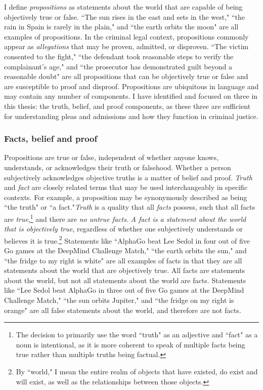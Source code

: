 I define \textit{propositions} as statements about the world that are capable of being objectively true or false. ``The sun rises in the east and sets in the west," ``the rain in Spain is rarely in the plain," and ``the earth orbits the moon" are all examples of propositions. In the criminal legal context, propositions commonly appear as \textit{allegations} that may be proven, admitted, or disproven. ``The victim consented to the fight," ``the defendant took reasonable steps to verify the complainant's age," and ``the prosecutor has demonstrated guilt beyond a reasonable doubt" are all propositions that can be objectively true or false and are susceptible to proof and disproof. Propositions are ubiquitous in language and may contain any number of components. I have identified and focused on three in this thesis: the truth, belief, and proof components, as these three are sufficient for understanding pleas and admissions and how they function in criminal justice.

\subsubsection{Facts, belief and proof}

Propositions are true or false, independent of whether anyone knows, understands, or acknowledges their truth or falsehood. Whether a person subjectively acknowledges objective truths is a matter of belief and proof. \textit{Truth} and \textit{fact} are closely related terms that may be used interchangeably in specific contexts. For example, a proposition may be synonymously described as being ``the truth" or ``a fact."\textit{Truth} is a quality that all \textit{facts} possess, such that all facts are \textit{true},\footnote{The decision to primarily use the word ``truth" as an adjective and ``fact" as a noun is intentional, as it is more coherent to speak of multiple facts being true rather than multiple truths being factual.} and there are \textit{no untrue facts}. \textit{A fact is a statement about the world that is objectively true}, regardless of whether one subjectively understands or believes it is true.\footnote{By ``world," I mean the entire realm of objects that have existed, do exist and will exist, as well as the relationships between those objects.} Statements like ``AlphaGo beat Lee Sedol in four out of five Go games at the DeepMind Challenge Match," ``the earth orbits the sun," and ``the fridge to my right is white" are all examples of facts in that they are all statements about the world that are objectively true. All facts are statements about the world, but not all statements about the world are facts. Statements like ``Lee Sedol beat AlphaGo in three out of five Go games at the DeepMind Challenge Match," ``the sun orbits Jupiter," and ``the fridge on my right is orange" are all false statements about the world, and therefore are not facts.

